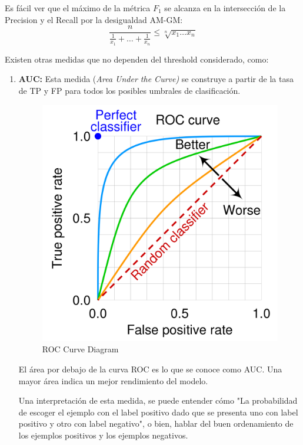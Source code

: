 Es fácil ver que el máximo de la métrica $F_{1}$ se alcanza en la intersección de la Precision y el Recall por la desigualdad AM-GM:
$$ 
\frac{n}{\frac{1}{x_1} + \dots + \frac{1}{x_n}} \leq \sqrt[n]{x_1 \dots x_n}
$$

Existen otras medidas que no dependen del threshold considerado, como: 

\begin{enumerate}
    \item \textbf{AUC: } Esta medida (\textit{Area Under the Curve)} se construye a partir de la tasa de TP y FP para todos los posibles umbrales de clasificación. 

    \begin{figure}[H]
    \center
    \includegraphics[scale=0.1]{notebooks/Others/img/roc_curve_diagram.png}
    \caption{ROC Curve Diagram}
    \end{figure}

    El área por debajo de la curva ROC es lo que se conoce como AUC. Una mayor área indica un mejor rendimiento del modelo. 

    Una interpretación de esta medida, se puede entender cómo "La probabilidad de escoger el ejemplo con el label positivo dado que se presenta uno con label positivo y otro con label negativo", o bien, hablar del buen ordenamiento de los ejemplos positivos y los ejemplos negativos. 
    

\end{enumerate}
